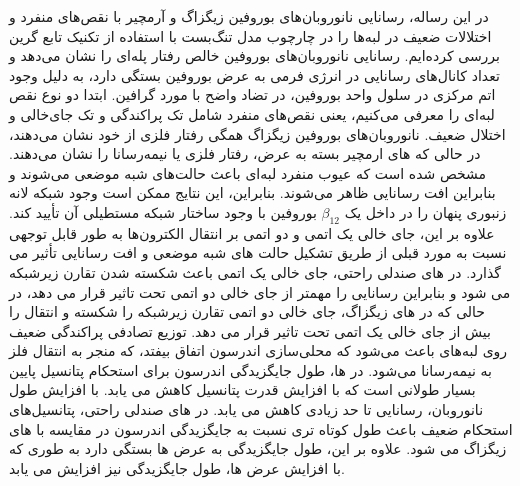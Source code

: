 در این رساله، رسانایی نانوروبان‌های ‌بوروفین زیگزاگ و آرمچیر با نقص‌های منفرد و اختلالات ضعیف در لبه‌ها را در چارچوب مدل تنگ‌بست با استفاده از تکنیک تابع گرین بررسی کرده‌ایم. رسانایی نانوروبان‌های بوروفین خالص رفتار پله‌ای را نشان می‌دهد و تعداد کانال‌های رسانایی در انرژی فرمی به عرض ‌بوروفین بستگی دارد، به دلیل وجود اتم مرکزی در سلول واحد بوروفین، در تضاد واضح با مورد گرافین. ابتدا دو نوع نقص لبه‌ای را معرفی می‌کنیم، یعنی نقص‌های منفرد شامل تک پراکندگی و تک جای‌خالی و اختلال ضعیف. نانوروبان‌های بوروفین زیگزاگ همگی رفتار فلزی از خود نشان می‌دهند، در حالی که  های ارمچیر بسته به عرض، رفتار فلزی یا نیمه‌رسانا را نشان می‌دهند. مشخص شده است که عیوب منفرد لبه‌ای باعث حالت‌های شبه موضعی می‌شوند و بنابراین افت رسانایی ظاهر می‌شوند. بنابراین، این نتایج ممکن است وجود شبکه لانه زنبوری پنهان را در داخل یک $\beta_{12}$ ‌بوروفین با وجود ساختار شبکه مستطیلی آن تأیید کند. علاوه بر این، جای خالی یک اتمی و دو اتمی بر انتقال الکترون‌ها به طور قابل توجهی نسبت به مورد قبلی از طریق تشکیل حالت های شبه موضعی و افت رسانایی تأثیر می گذارد. در  های صندلی راحتی، جای خالی یک اتمی باعث شکسته شدن تقارن زیرشبکه می شود و بنابراین رسانایی را مهمتر از جای خالی دو اتمی تحت تاثیر قرار می دهد، در حالی که در  های زیگزاگ، جای خالی دو اتمی تقارن زیرشبکه را شکسته و انتقال را بیش از جای خالی یک اتمی تحت تاثیر قرار می دهد. توزیع تصادفی پراکندگی ضعیف روی لبه‌های  باعث می‌شود که محلی‌سازی اندرسون اتفاق بیفتد، که منجر به انتقال فلز به نیمه‌رسانا می‌شود. در  ها، طول جایگزیدگی اندرسون برای استحکام پتانسیل پایین بسیار طولانی است که با افزایش قدرت پتانسیل کاهش می یابد. با افزایش طول نانوروبان، رسانایی تا حد زیادی کاهش می یابد. در  های صندلی راحتی، پتانسیل‌های استحکام ضعیف باعث طول کوتاه تری نسبت به جایگزیدگی اندرسون در مقایسه با  های زیگزاگ می شود. علاوه بر این، طول جایگزیدگی به عرض  ها بستگی دارد به طوری که با افزایش عرض  ها، طول جایگزیدگی نیز افزایش می یابد.

